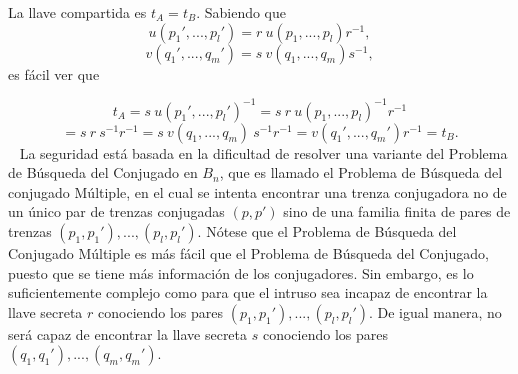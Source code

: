\documentclass[12pt]{book}
\theoremstyle{definition}
\begin{document}
La llave compartida es $t_A = t_B$. Sabiendo que 
$$u(p_1',...,p_l')=r\ u(p_1,...,p_l)r^{-1},$$
$$v(q_1',...,q_m')=s\ v(q_1,...,q_m)s^{-1},$$
es fácil ver que

$$t_A = s\ u(p_1',...,p_l')^{-1} = s\ r\ u(p_1,...,p_l)^{-1}r^{-1}$$
$$=s\ r\ s^{-1}r^{-1}= s\ v(q_1,...,q_m)\ s^{-1}r^{-1}=v(q_1',...,q_m')r^{-1} = t_B.$$
\
\newline
La seguridad está basada en la dificultad de resolver una variante del Problema de Búsqueda del Conjugado en $B_n$, que es llamado el Problema de Búsqueda del conjugado Múltiple, en el cual se intenta encontrar una trenza conjugadora no de un único par de trenzas conjugadas $(p,p')$ sino de una familia finita de pares de trenzas $(p_1,p_1'),...,(p_l,p_l')$. Nótese que el Problema de Búsqueda del Conjugado Múltiple es más fácil que el Problema de Búsqueda del Conjugado, puesto que se tiene más información de los conjugadores. Sin embargo, es lo suficientemente complejo como para que el intruso sea incapaz de encontrar la llave secreta $r$ conociendo los pares $(p_1,p_1'),...,(p_l,p_l')$. De igual manera, no será capaz de encontrar la llave secreta $s$ conociendo los pares $(q_1,q_1'),...,(q_m,q_m')$.
\end{document}
